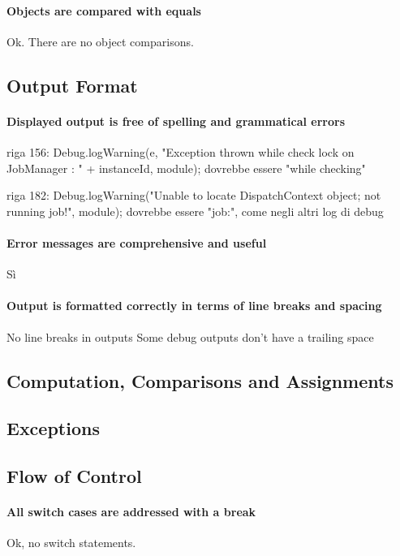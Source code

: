 \documentclass[english]{article}
\begin{document}
\paragraph{Objects are compared with equals}
Ok.
There are no object comparisons.

\subsection{Output Format}
\paragraph{Displayed output is free of spelling and grammatical errors}
riga 156:
Debug.logWarning(e, "Exception thrown while check lock on JobManager : " + instanceId, module);
dovrebbe essere "while checking"

riga 182:
Debug.logWarning("Unable to locate DispatchContext object; not running job!", module);
dovrebbe essere "job:", come negli altri log di debug

\paragraph{Error messages are comprehensive and useful}
Sì

\paragraph{Output is formatted correctly in terms of line breaks and spacing}
No line breaks in outputs
Some debug outputs don't have a trailing space ~

\subsection{Computation, Comparisons and Assignments}

\subsection{Exceptions}


\subsection{Flow of Control}
\paragraph{All switch cases are addressed with a break}
Ok, no switch statements.
\end{document}
